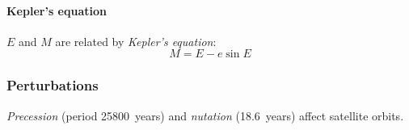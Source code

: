 \paragraph{Kepler's equation}
$E$ and $M$ are related by \emph{Kepler's equation}:
\begin{equation}
    M = E - e \sin E
\end{equation}



\subsubsection{Perturbations}
\emph{Precession} (period \SI{25800}{years}) and \emph{nutation} (\SI{18.6}{years}) affect satellite orbits.
